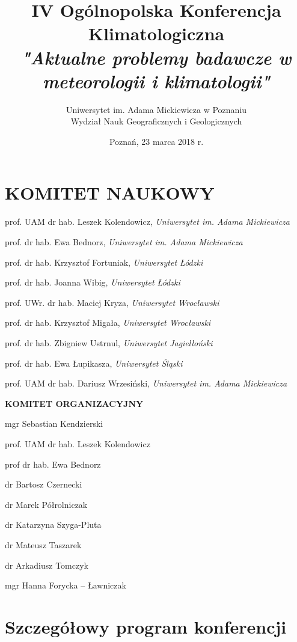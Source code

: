 \documentclass[12pt,oneside]{book}
\title{IV Ogólnopolska Konferencja Klimatologiczna \\ \emph{"Aktualne problemy badawcze w meteorologii i klimatologii"}}
\date{Poznań, 23 marca 2018 r.}
\author{Uniwersytet im. Adama Mickiewicza w Poznaniu\\Wydział Nauk Geograficznych i Geologicznych}
\begin{document}
% 

\frontmatter
\maketitle

\chapter*{KOMITET NAUKOWY}
\vspace{-0.5cm}
prof. UAM dr hab. Leszek Kolendowicz, \textit{Uniwersytet im. Adama Mickiewicza}

prof. dr hab. Ewa Bednorz, \textit{Uniwersytet im. Adama Mickiewicza}

prof. dr hab. Krzysztof Fortuniak,  \textit{Uniwersytet Łódzki}

prof. dr hab. Joanna Wibig, \textit{Uniwersytet Łódzki}

prof. UWr. dr hab. Maciej Kryza, \textit{Uniwersytet Wrocławski}

prof. dr hab. Krzysztof Migała,  \textit{Uniwersytet Wrocławski}

prof. dr hab. Zbigniew Ustrnul,  \textit{Uniwersytet Jagielloński}

prof. dr hab. Ewa Łupikasza,  \textit{Uniwersytet Śląski}

prof. UAM dr hab. Dariusz Wrzesiński, \textit{Uniwersytet im. Adama Mickiewicza}


\vspace{2cm}
\Large{\textbf{KOMITET ORGANIZACYJNY}}
\vspace{0.5cm}

\normalsize 

mgr Sebastian Kendzierski

prof. UAM dr hab. Leszek Kolendowicz

prof dr hab. Ewa Bednorz

dr Bartosz Czernecki

dr Marek Półrolniczak

dr Katarzyna Szyga-Pluta

dr Mateusz Taszarek

dr Arkadiusz Tomczyk

mgr Hanna Forycka -- Ławniczak


\chapter{Szczegółowy program konferencji }
\end{document}
